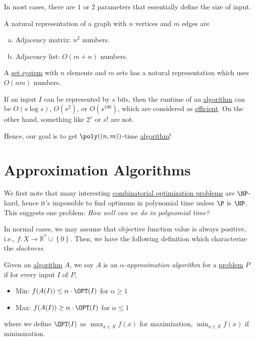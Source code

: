 \begin{note}
	In most cases, there are \(1\) or \(2\) parameters that essentially define the size of input.

	\begin{eg}[Graph]
		A natural representation of a graph with \(n\) vertices and \(m\) edges are
		\begin{enumerate}[(a)]
			\item Adjacency matrix: \(n ^{2} \) numbers.
			\item Adjacency list: \(O(m+n)\) numbers.
		\end{enumerate}
	\end{eg}

	\begin{eg}
		A \hyperref[def:set-system]{set system} with \(n\) elements and \(m\) sets has a natural representation which uses \(O(nm)\) numbers.
	\end{eg}
\end{note}

\begin{eg}
	If an input \(I\) can be represented by \(s\) bits, then the runtime of an \hyperref[def:algorithm]{algorithm} can be \(O(s \log s)\), \(O(s ^{2} )\), or \(O(s^{100} )\), which are considered as \hyperref[def:efficient]{efficient}. On the other hand, something like \(2^s\) or \(s!\) are not.
\end{eg}

Hence, our goal is to get \(\poly((n, m))\)-time \hyperref[def:algorithm]{algorithm}!

\section{Approximation Algorithms}

We first note that many interesting \hyperref[def:combinatorial-optimization]{combinatorial optimization problems} are \(\NP\)-hard, hence it's impossible to find optimum in polynomial time unless \(\P\) is \(\NP\). This suggests one problem: \emph{How well can we do in polynomial time?}

In normal cases, we may assume that objective function value is always positive, i.e., \(f\colon X \to \mathbb{R} ^* \cup \left\{ 0 \right\} \). Then, we have the following definition which characterize the \emph{slackness}.

\begin{definition}\label{def:approximation-algorithm}
	Given an \hyperref[def:algorithm]{algorithm} \(A\), we say \(A\) is an \emph{\(\alpha\)-approximation algorithm} for a \hyperref[def:computational-problem]{problem} \(P\) if for every input \(I\) of \(P\),
	\begin{itemize}
		\item Min: \(f(A(I)) \leq \alpha \cdot \OPT (I)\) for \(\alpha \geq 1\)
		\item Max: \(f(A(I)) \geq \alpha \cdot \OPT (I)\) for \(\alpha \leq 1\)
	\end{itemize}
	where we define \(\OPT(I)\) as \(\max _{x\in X}f(x)\) for maximization, \(\min _{x\in X}f(x)\) if minimization.
\end{definition}

